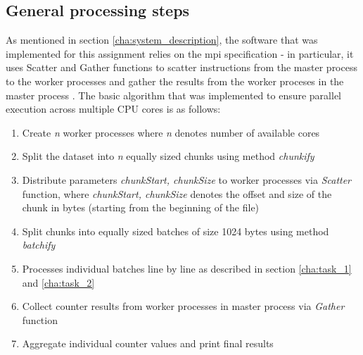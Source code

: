 \documentclass[paper=a4, fontsize=11pt]{scrartcl}
\numberwithin{equation}{section}		%
\numberwithin{figure}{section}			%
\numberwithin{table}{section}				%
\begin{document}
\subsection{General processing steps}
As mentioned in section \ref{cha:system_description}, the software that was implemented for this assignment relies on the \acrfull{mpi} specification - in particular, it uses Scatter and Gather functions to scatter instructions from the master process to the worker processes and gather the results from the worker proceses in the master process \citep{RN312}. The basic algorithm that was implemented to ensure parallel execution across multiple CPU cores is as follows:
\begin{enumerate}
  \item Create \emph{n} worker processes where \emph{n} denotes number of available cores
  \item Split the dataset into \emph{n} equally sized chunks using method \emph{chunkify}
  \item Distribute parameters \emph{chunkStart, chunkSize} to worker processes via \emph{Scatter} function, where \emph{chunkStart, chunkSize} denotes the offset and size of the chunk in bytes (starting from the beginning of the file)
  \item Split chunks into equally sized batches of size 1024 bytes using method \emph{batchify}
  \item Processes individual batches line by line as described in section \ref{cha:task_1} and \ref{cha:task_2}
  \item Collect counter results from worker processes in master process via \emph{Gather} function
  \item Aggregate individual counter values and print final results
\end{enumerate}
\end{document}
